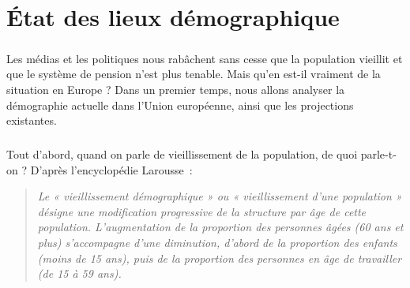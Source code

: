 \chapter{État des lieux démographique}
\paragraph{}Les médias et les politiques nous rabâchent sans cesse que la population vieillit et que le système de pension n’est plus tenable. Mais qu’en est-il vraiment de la situation en Europe ?  Dans un premier temps, nous allons analyser la démographie actuelle dans l’Union européenne, ainsi que les projections existantes.

\paragraph{}Tout d'abord, quand on parle de vieillissement de la population, de quoi parle-t-on ? D’après l’encyclopédie Larousse~\citep{larousse}: 
\begin{quotation}
\textit{Le « vieillissement démographique » ou « vieillissement d'une population » désigne une modification progressive de la structure par âge de cette population. L'augmentation de la proportion des personnes âgées (60 ans et plus) s'accompagne d'une diminution, d'abord de la proportion des enfants (moins de 15 ans), puis de la proportion des personnes en âge de travailler (de 15 à 59 ans).}
\end{quotation}

